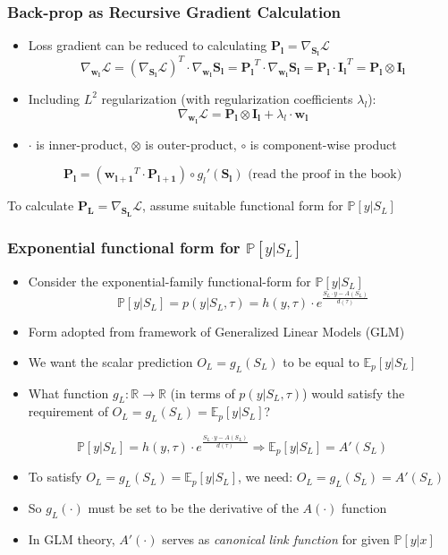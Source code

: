 \documentclass[handout]{beamer}
\begin{document}
\begin{frame}
\frametitle{Back-prop as Recursive Gradient Calculation}
\pause
\begin{itemize}[<+->]
\item Loss gradient can be reduced to calculating $\bm{P_l} = \nabla_{\bm{S_l}} \mathcal{L}$
$$\nabla_{\bm{w_l}} \mathcal{L} = (\nabla_{\bm{S_l}} \mathcal{L})^T \cdot \nabla_{\bm{w_l}} \bm{S_l} = \bm{P_l}^T \cdot \nabla_{\bm{w_l}} \bm{S_l} = \bm{P_l} \cdot \bm{I_l}^T = \bm{P_l} \otimes \bm{I_l}$$
\item Including $L^2$ regularization (with regularization coefficients $\lambda_l$):
$$\nabla_{\bm{w_l}} \mathcal{L} = \bm{P_l} \otimes \bm{I_l} + \lambda_l \cdot \bm{w_l} $$
\item $\cdot$ is inner-product, $\otimes$ is outer-product, $\circ$ is component-wise product
\end{itemize}
\pause
\begin{theorem}
$$\bm{P_l} = (\bm{w_{l+1}}^T \cdot \bm{P_{l+1}}) \circ g_l'(\bm{S_l}) \text{ (read the proof in the book)}$$
\end{theorem}
\pause
To calculate $\bm{P_L} = \nabla_{\bm{S_L}} \mathcal{L}$, assume suitable functional form for $\mathbb{P}[y|S_L]$
\end{frame}

\begin{frame}
\frametitle{Exponential functional form for $\mathbb{P}[y|S_L]$}
\pause
\begin{itemize}[<+->]
\item Consider the exponential-family functional-form for $\mathbb{P}[y|S_L]$
$$\mathbb{P}[y|S_L] = p(y|S_L, \tau) = h(y, \tau) \cdot e^{\frac {S_L \cdot y - A(S_L)} {d(\tau)}}$$
\item Form adopted from framework of Generalized Linear Models (GLM)
\item We want the scalar prediction $O_L = g_L(S_L)$ to be equal to $\mathbb{E}_p[y|S_L]$
\item What function $g_L: \mathbb{R} \rightarrow \mathbb{R}$ (in terms of $p(y|S_L, \tau)$) would satisfy the requirement of $O_L = g_L(S_L) = \mathbb{E}_p[y|S_L]$?
\end{itemize}
\pause
\begin{lemma}
$$\mathbb{P}[y|S_L] = h(y, \tau) \cdot e^{\frac {S_L \cdot y - A(S_L)} {d(\tau)}} \Rightarrow \mathbb{E}_p[y|S_L] = A'(S_L)$$
\end{lemma}
\pause
\begin{itemize}[<+->]
\item To satisfy $O_L = g_L(S_L) = \mathbb{E}_p[y|S_L]$, we need: $O_L = g_L(S_L) = A'(S_L)$
\item So $g_L(\cdot)$ must be set to be the derivative of the $A(\cdot)$ function
\item In GLM theory, $A'(\cdot)$ serves as {\em canonical link function} for given $\mathbb{P}[y|x]$
\end{itemize}
\end{frame}
\end{document}
